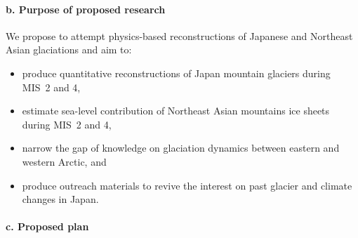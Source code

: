 \documentclass{article}
\begin{document}
\paragraph{b. Purpose of proposed research}

    We propose to attempt physics-based reconstructions of Japanese and
    Northeast Asian glaciations and aim to:

    \begin{itemize}
      \item{produce quantitative reconstructions of Japan mountain glaciers
            during MIS~2 and 4,}
      \item{estimate sea-level contribution of Northeast Asian mountains ice
            sheets during MIS~2 and 4,}
      \item{narrow the gap of knowledge on glaciation dynamics between
            eastern and western Arctic, and}
      \item{produce outreach materials to revive the interest on past glacier
            and climate changes in Japan.}
    \end{itemize}


\paragraph{c. Proposed plan}
\end{document}
